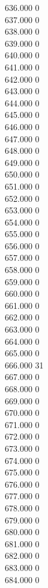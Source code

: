 { 636.000	0 \\
 637.000	0 \\
 638.000	0 \\
 639.000	0 \\
 640.000	0 \\
 641.000	0 \\
 642.000	0 \\
 643.000	0 \\
 644.000	0 \\
 645.000	0 \\
 646.000	0 \\
 647.000	0 \\
 648.000	0 \\
 649.000	0 \\
 650.000	0 \\
 651.000	0 \\
 652.000	0 \\
 653.000	0 \\
 654.000	0 \\
 655.000	0 \\
 656.000	0 \\
 657.000	0 \\
 658.000	0 \\
 659.000	0 \\
 660.000	0 \\
 661.000	0 \\
 662.000	0 \\
 663.000	0 \\
 664.000	0 \\
 665.000	0 \\
 666.000	31 \\
 667.000	0 \\
 668.000	0 \\
 669.000	0 \\
 670.000	0 \\
 671.000	0 \\
 672.000	0 \\
 673.000	0 \\
 674.000	0 \\
 675.000	0 \\
 676.000	0 \\
 677.000	0 \\
 678.000	0 \\
 679.000	0 \\
 680.000	0 \\
 681.000	0 \\
 682.000	0 \\
 683.000	0 \\
 684.000	0 \\
}
